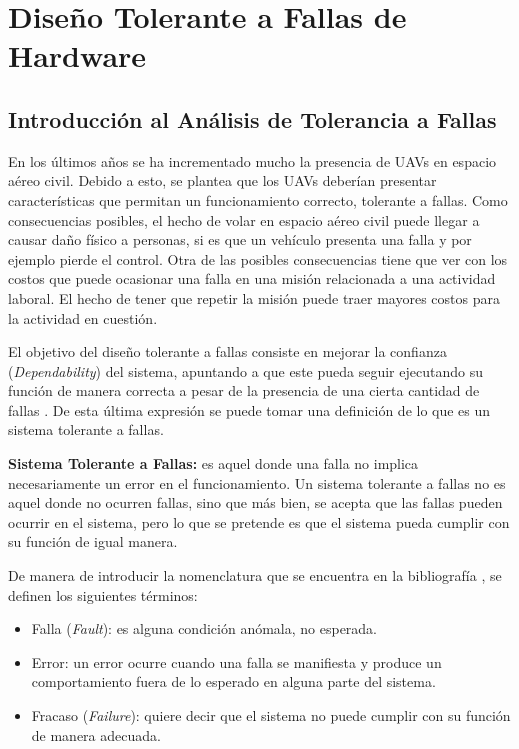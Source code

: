 \section{Diseño Tolerante a Fallas de Hardware}

\subsection{Introducción al Análisis de Tolerancia a Fallas}\label{subsec:introduccion_al_analisis_de_tolerancia_a_fallas}

En los últimos años se ha incrementado mucho la presencia de UAVs en espacio aéreo civil. Debido a esto, se plantea que los UAVs deberían presentar características que permitan un funcionamiento correcto, tolerante a fallas. Como consecuencias posibles, el hecho de volar en espacio aéreo civil puede llegar a causar daño físico a personas, si es que un vehículo presenta una falla y por ejemplo pierde el control. Otra de las posibles consecuencias tiene que ver con los costos que puede ocasionar una falla en una misión relacionada a una actividad laboral. El hecho de tener que repetir la misión puede traer mayores costos para la actividad en cuestión.

El objetivo del diseño tolerante a fallas consiste en mejorar la confianza (\textit{Dependability}) del sistema, apuntando a que este pueda seguir ejecutando su función de manera correcta a pesar de la presencia de una cierta cantidad de fallas \cite{nelson1990fault}. De esta última expresión se puede tomar una definición de lo que es un sistema tolerante a fallas.

\begin{mydef}
    \textbf{Sistema Tolerante a Fallas:} es aquel donde una falla no implica necesariamente un error en el funcionamiento. Un sistema tolerante a fallas no es aquel donde no ocurren fallas, sino que más bien, se acepta que las fallas pueden ocurrir en el sistema, pero lo que se pretende es que el sistema pueda cumplir con su función de igual manera.
\end{mydef}

De manera de introducir la nomenclatura que se encuentra en la bibliografía \cite{nelson1990fault}, se definen los siguientes términos:

\begin{itemize}
    \item Falla (\textit{Fault}): es alguna condición anómala, no esperada.
    \item Error: un error ocurre cuando una falla se manifiesta y produce un comportamiento fuera de lo esperado en alguna parte del sistema.
    \item Fracaso (\textit{Failure}): quiere decir que el sistema no puede cumplir con su función de manera adecuada.
\end{itemize}

